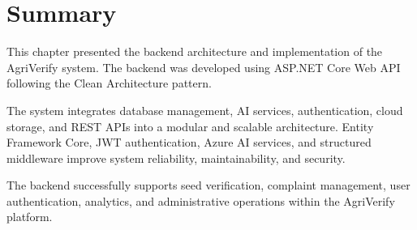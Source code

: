 \section{Summary}
\label{sec:backend-summary}

This chapter presented the backend architecture and implementation of the AgriVerify system. The backend was developed using ASP.NET Core Web API following the Clean Architecture pattern.

The system integrates database management, AI services, authentication, cloud storage, and REST APIs into a modular and scalable architecture. Entity Framework Core, JWT authentication, Azure AI services, and structured middleware improve system reliability, maintainability, and security.

The backend successfully supports seed verification, complaint management, user authentication, analytics, and administrative operations within the AgriVerify platform.